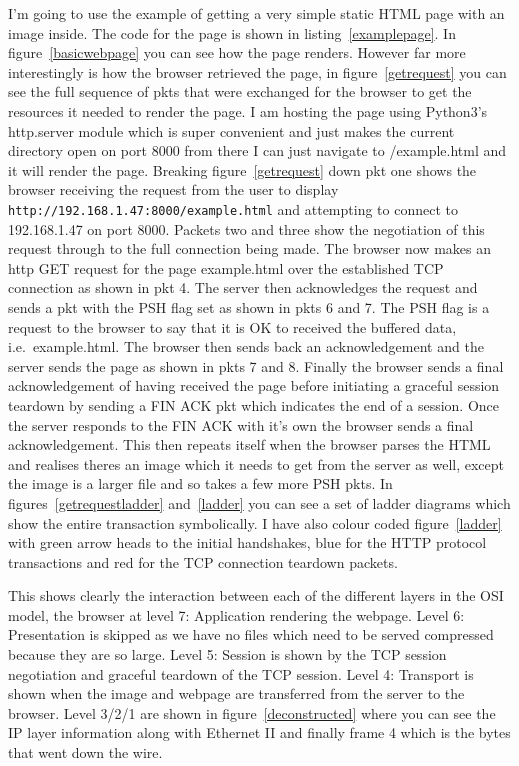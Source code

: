\documentclass[titlepage]{article}
\begin{document}
I'm going to use the example of getting a very simple static HTML page with an image inside. The 
code for the page is shown in listing~\ref{examplepage}. In figure~\ref{basicwebpage} you can see 
how the page renders. However far more interestingly is how the browser retrieved the page, in 
figure~\ref{getrequest} you can see the full sequence of \glspl{pkt} that were exchanged for the 
browser to get the resources it needed to render the page. I am hosting the page using Python3's 
http.server module which is super convenient and just makes the current directory open on port 8000 
from there I can just navigate to /example.html and it will render the page. Breaking 
figure~\ref{getrequest} down \gls{pkt} one shows the browser receiving the request from the user to 
display \verb|http://192.168.1.47:8000/example.html| and attempting to connect to 192.168.1.47 on 
port 8000. Packets two and three show the negotiation of this request through to the full connection 
being made. The browser now makes an \gls{http} GET request for the page example.html over the 
established TCP connection as shown in \gls{pkt} 4. The server then acknowledges the request and 
sends a \gls{pkt} with the PSH flag set as shown in \glspl{pkt} 6 and 7. The PSH flag is a request 
to the browser to say that it is OK to received the buffered data, i.e.\ example.html. The browser 
then sends back an acknowledgement and the server sends the page as shown in \glspl{pkt} 7 and 8. 
Finally the browser sends a final acknowledgement of having received the page before initiating a 
graceful session teardown by sending a FIN ACK \gls{pkt} which indicates the end of a session. Once 
the server responds to the FIN ACK with it's own the browser sends a final acknowledgement. This 
then repeats itself when the browser parses the HTML and realises theres an image which it needs to 
get from the server as well, except the image is a larger file and so takes a few more PSH 
\glspl{pkt}. In figures~\ref{getrequestladder} and~\ref{ladder} you can see a set of ladder diagrams
which show the entire transaction symbolically. I have also colour coded figure~\ref{ladder} with
green arrow heads to the initial handshakes, blue for the HTTP protocol transactions and red for
the TCP connection teardown packets.

This shows clearly the interaction between each of the different layers in the OSI model,
the browser at level 7: Application rendering the webpage. Level 6: Presentation is skipped as
we have no files which need to be served compressed because they are so large. Level 5: Session
is shown by the TCP session negotiation and graceful teardown of the TCP session. Level 4: Transport
is shown when the image and webpage are transferred from the server to the browser. Level 3/2/1
are shown in figure~\ref{deconstructed} where you can see the IP layer information along with
Ethernet II and finally frame 4 which is the bytes that went down the wire.
\end{document}
